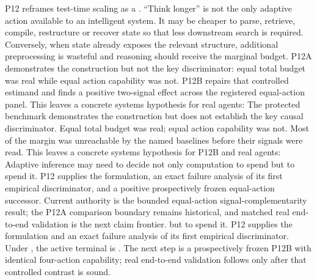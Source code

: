 \markdownRendererDocumentBegin
\markdownRendererSectionBegin
{}\markdownRendererInterblockSeparator
{}P12 reframes test-time scaling as a . “Think longer” is not the only adaptive action available to an intelligent system. It may be cheaper to parse, retrieve, compile, restructure or recover state so that less downstream search is required. Conversely, when state already exposes the relevant structure, additional preprocessing is wasteful and reasoning should receive the marginal budget.\markdownRendererInterblockSeparator
{}P12A demonstrates the construction but not the key discriminator: equal total budget was real while equal action capability was not. P12B repairs that controlled estimand and finds a positive two-signal effect across the registered equal-action panel.\markdownRendererInterblockSeparator
{}This leaves a concrete systems hypothesis for real agents: The protected benchmark demonstrates the construction but does not establish the key causal discriminator. Equal total budget was real; equal action capability was not. Most of the margin was unreachable by the named baselines before their signals were read.\markdownRendererInterblockSeparator
{}This leaves a concrete systems hypothesis for P12B and real agents: \markdownRendererInterblockSeparator
{}Adaptive inference may need to decide not only  computation to spend but  to spend it. P12 supplies the formulation, an exact failure analysis of its first empirical discriminator, and a positive prospectively frozen equal-action successor. Current authority is the bounded equal-action signal-complementarity result; the P12A comparison boundary remains historical, and matched real end-to-end validation is the next claim frontier. but  to spend it. P12 supplies the formulation and an exact failure analysis of its first empirical discriminator. Under , the active terminal is . The next step is a prospectively frozen P12B with identical four-action capability; real end-to-end validation follows only after that controlled contrast is sound.
\markdownRendererSectionEnd \markdownRendererDocumentEnd